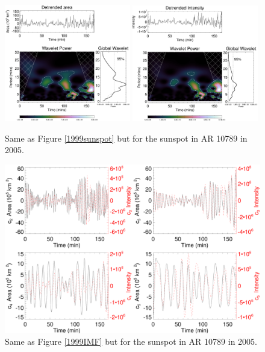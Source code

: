    \begin{figure}
   \centering
   \includegraphics[width=0.49\textwidth]{2005_wl.eps}
   \includegraphics[width=0.49\textwidth]{2005_wl_inten.eps}
      \caption{
      			Same as Figure \ref{1999sunspot} but for the sunspot in AR 10789 in 2005.
      		  }
      \label{2005sunspot}
   \end{figure}

   \begin{figure}
   \centering
   \includegraphics[width=\textwidth]{2005_IMFs.eps}
      \caption{
      			Same as Figure \ref{1999IMF} but for the sunspot in AR 10789 in 2005.
      		  }
      \label{20005IMF}
   \end{figure}
   
